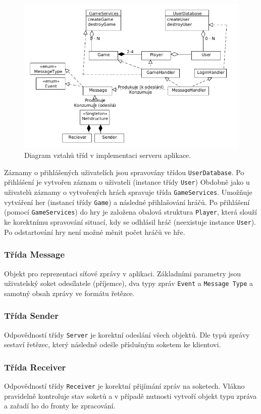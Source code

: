 \documentclass[12pt, a4paper]{article}
\begin{document}
\begin{figure}[ht]
\centering
\includegraphics[bb= 0 0 730 490 , width=12cm]{server.png}
\caption{Diagram vztahů tříd v implementaci serveru aplikace.}
\label{fig:game}
\end{figure}

Záznamy o přihlášených uživatelích jsou spravovány třídou \texttt{UserDatabase}. Po přihlášení je vytvořen záznam o uživateli (instance třídy \texttt{User}) Obdobně jako u uživatelů záznamy o vytvořených hrách spravuje třída \texttt{GameServices}. Umožňuje vytváření her (instancí třídy \texttt{Game}) a následné přihlašování hráčů. Po přihlášení (pomocí \texttt{GameServices}) do hry je založena obalová struktura \texttt{Player}, která slouží ke korektnímu spravování situací, kdy se odhlásil hráč (neexistuje instance \texttt{User}). Po odstartování hry není možné měnit počet hráčů ve hře.

\subsubsection{Třída Message}
Objekt pro reprezentaci síťové zprávy v aplikaci. Základními parametry jsou uživatelský soket odesílatele (příjemce), dva typy zpráv \texttt{Event} a \texttt{Message Type} a samotný obsah zprávy ve formátu řetězce.

\subsubsection{Třída Sender}
Odpovědností třídy \texttt{Server} je korektní odeslání všech objektů. Dle typů zprávy sestaví řetězec, který následně odešle příslušným soketem ke klientovi.

\subsubsection{Třída Receiver}
Odpovědností třídy \texttt{Receiver} je korektní přijímání zpráv na soketech. Vlákno pravidelně kontroluje stav soketů a v případě nutnosti vytvoří objekt typu zpráva a zařadí ho do fronty ke zpracování. 
\end{document}
